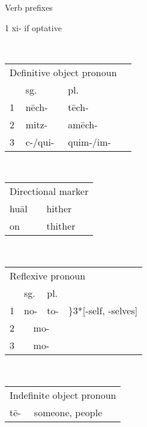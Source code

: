 \documentclass[12pt]{beamer}
\newcommand{\nah}[1]{\textcolor{nahgrn}{#1}}
\newcommand{\trs}[1]{\textcolor{nahblu}{#1}}
\begin{document}
\begin{frame}
\begin{columns}[t]
\begin{column}{0.18\linewidth}
\begin{block}{Verb prefixes}
\begin{threeparttable}
\begin{tablenotes}
            \item[1] \nah{xi-} if optative
          \end{tablenotes}
        \end{threeparttable}
        \\[1ex]
        \begin{tabular}[t]{llll}
          \multicolumn{3}{l}{Definitive object pronoun} \\
            & sg.           & pl.                       \\
          1 & \nah{nēch-}   & \nah{tēch-}               \\
          2 & \nah{mitz-}   & \nah{amēch-}              \\
          3 & \nah{c-/qui-} & \nah{quim-/im-}           \\
        \end{tabular}
        \\[1ex]
        \begin{tabular}[t]{ll}
          \multicolumn{2}{l}{Directional marker} \\
          \nah{huāl} & \trs{hither}              \\
          \nah{on}   & \trs{thither}             \\
        \end{tabular}
        \\[1ex]
        \begin{tabular}[t]{llll}
          \multicolumn{4}{l}{Reflexive pronoun}                                                              \\
            & sg.                           & pl.       &                                                    \\
          1 & \nah{no-}                     & \nah{to-} & \trs{\hspace{-1em}\rdelim\}{3}{*}[-self, -selves]} \\
          2 & \multicolumn{2}{c}{\nah{mo-}}                                                                  \\
          3 & \multicolumn{2}{c}{\nah{mo-}}                                                                  \\
        \end{tabular}
        \\[1ex]
        \begin{tabular}[t]{ll}
          \multicolumn{2}{l}{Indefinite object pronoun} \\
          \nah{tē-}  & \trs{someone, people}            \\

\end{tabular}
\end{block}
\end{column}
\end{columns}
\end{frame}
\end{document}
